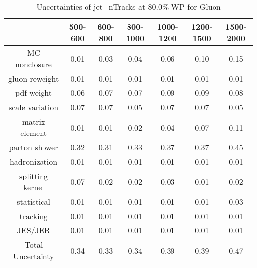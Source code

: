 \begin{table}
\centering
\caption{Uncertainties of jet_nTracks at 80.0\% WP for Gluon}
\label{tab:syst_jet_nTracks_0.8_Gluon}
\begin{tabular}{ccccccc}
\toprule
{} &  500-600 &  600-800 &  800-1000 &  1000-1200 &  1200-1500 &  1500-2000 \\
\midrule
MC nonclosure     &     0.01 &     0.03 &      0.04 &       0.06 &       0.10 &       0.15 \\
gluon reweight    &     0.01 &     0.01 &      0.01 &       0.01 &       0.01 &       0.01 \\
pdf weight        &     0.06 &     0.07 &      0.07 &       0.09 &       0.09 &       0.08 \\
scale variation   &     0.07 &     0.07 &      0.05 &       0.07 &       0.07 &       0.05 \\
matrix element    &     0.01 &     0.01 &      0.02 &       0.04 &       0.07 &       0.11 \\
parton shower     &     0.32 &     0.31 &      0.33 &       0.37 &       0.37 &       0.45 \\
hadronization     &     0.01 &     0.01 &      0.01 &       0.01 &       0.01 &       0.01 \\
splitting kernel  &     0.07 &     0.02 &      0.02 &       0.03 &       0.01 &       0.02 \\
statistical       &     0.01 &     0.01 &      0.01 &       0.01 &       0.01 &       0.03 \\
tracking          &     0.01 &     0.01 &      0.01 &       0.01 &       0.01 &       0.01 \\
JES/JER           &     0.01 &     0.01 &      0.01 &       0.01 &       0.01 &       0.01 \\
Total Uncertainty &     0.34 &     0.33 &      0.34 &       0.39 &       0.39 &       0.47 \\
\bottomrule
\end{tabular}
\end{table}
